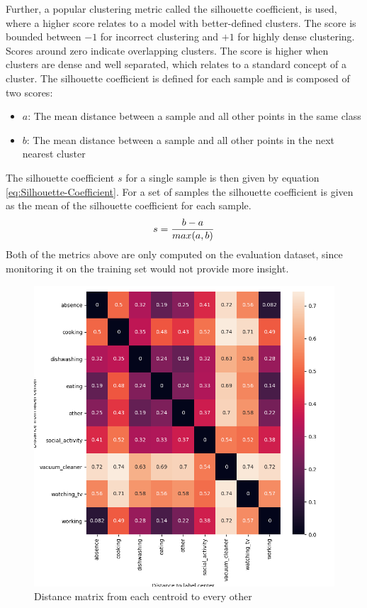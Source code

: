 \newline
Further, a popular clustering metric called the silhouette coefficient, is used, where a higher score relates to a model with better-defined clusters. The score is bounded between $-1$ for incorrect clustering and $+1$ for highly dense clustering. Scores around zero indicate overlapping clusters. The score is higher when clusters are dense and well separated, which relates to a standard concept of a cluster. The silhouette coefficient is defined for each sample and is composed of two scores:
\begin{itemize}
\setlength\itemsep{0em}
    \item $a$: The mean distance between a sample and all other points in the same class
    \item $b$: The mean distance between a sample and all other points in the next nearest cluster
\end{itemize}
The silhouette coefficient $s$ for a single sample is then given by equation \ref{eq:Silhouette-Coefficient}. For a set of samples the silhouette coefficient is given as the mean of the silhouette coefficient for each sample.
\begin{equation}
    \centering
    \begin{gathered}
        s = \frac{b - a}{max(a, b)}
    \end{gathered}
    \label{eq:Silhouette-Coefficient}
\end{equation}
Both of the metrics above are only computed on the evaluation dataset, since monitoring it on the training set would not provide more insight.
\begin{figure}[htbp]
	\centering
	\includegraphics[scale=0.25]{img/Distance_Metric.png}
	\caption{Distance matrix from each centroid to every other}
	\label{fig:Distance-Matrix}
\end{figure}

